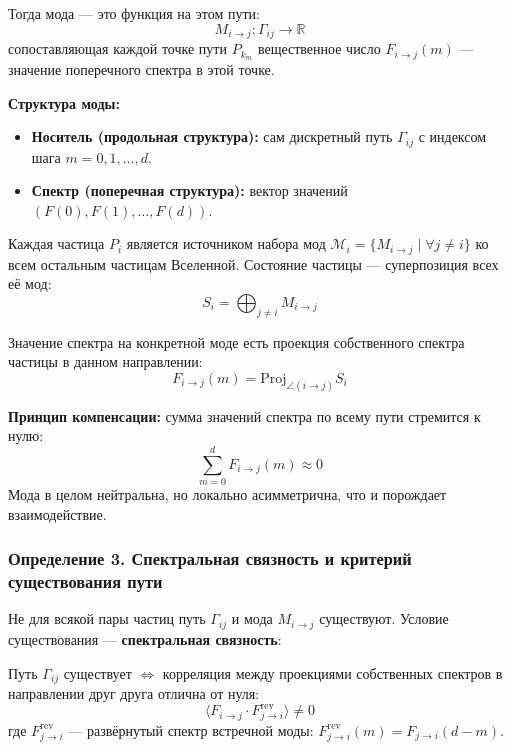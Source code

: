 \documentclass[12pt,a4paper]{article}
\begin{document}
Тогда мода --- это функция на этом пути:
\begin{equation}
    M_{i \to j}: \Gamma_{ij} \to \mathbb{R}
\end{equation}
сопоставляющая каждой точке пути $P_{k_m}$ вещественное число $F_{i \to j}(m)$ --- значение поперечного спектра в этой точке.

\textbf{Структура моды:}
\begin{itemize}
    \item \textbf{Носитель (продольная структура):} сам дискретный путь $\Gamma_{ij}$ с индексом шага $m = 0, 1, \dots, d$.
    \item \textbf{Спектр (поперечная структура):} вектор значений $(F(0), F(1), \dots, F(d))$.
\end{itemize}

Каждая частица $P_i$ является источником набора мод $\mathcal{M}_i = \{M_{i \to j} \mid \forall j \neq i\}$ ко всем остальным частицам Вселенной. Состояние частицы --- суперпозиция всех её мод:
\begin{equation}
    S_i = \bigoplus_{j \neq i} M_{i \to j}
\end{equation}

Значение спектра на конкретной моде есть проекция собственного спектра частицы в данном направлении:
\begin{equation}
    F_{i \to j}(m) = \text{Proj}_{\angle(i \to j)} S_i
\end{equation}

\textbf{Принцип компенсации:} сумма значений спектра по всему пути стремится к нулю:
\begin{equation}
    \sum_{m=0}^{d} F_{i \to j}(m) \approx 0
\end{equation}
Мода в целом нейтральна, но локально асимметрична, что и порождает взаимодействие.

\subsubsection{Определение 3. Спектральная связность и критерий существования пути}
Не для всякой пары частиц путь $\Gamma_{ij}$ и мода $M_{i \to j}$ существуют. Условие существования --- \textbf{спектральная связность}:

Путь $\Gamma_{ij}$ существует $\iff$ корреляция между проекциями собственных спектров в направлении друг друга отлична от нуля:
\begin{equation}
    \langle F_{i \to j} \cdot F_{j \to i}^{\text{rev}} \rangle \neq 0
\end{equation}
где $F_{j \to i}^{\text{rev}}$ --- развёрнутый спектр встречной моды: $F_{j \to i}^{\text{rev}}(m) = F_{j \to i}(d-m)$.
\end{document}
